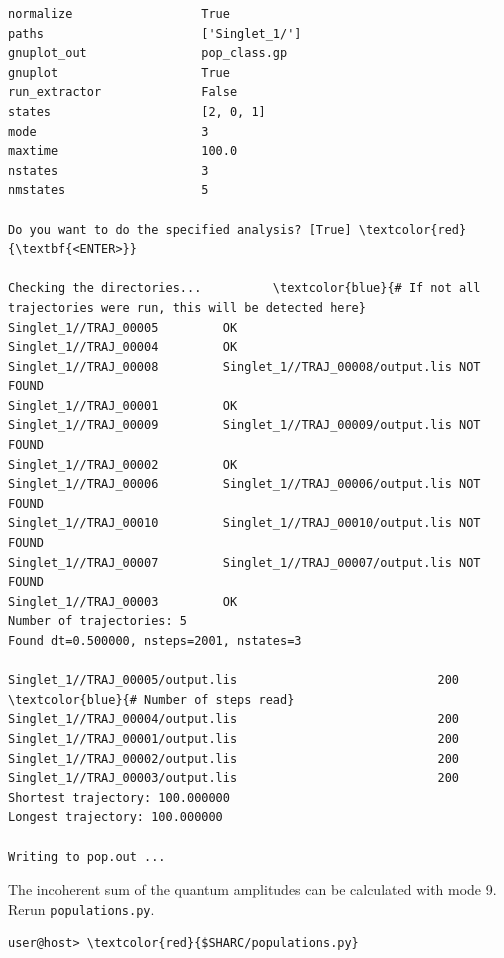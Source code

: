\documentclass[a4paper,11pt,DIV=15,openany]{scrbook}
\newcommand{\ttt}[1]{\texttt{#1}}
\begin{document}
\begin{oframed}
\begin{Verbatim}[commandchars=\\\{\}]
normalize                  True
paths                      ['Singlet_1/']
gnuplot_out                pop_class.gp
gnuplot                    True
run_extractor              False
states                     [2, 0, 1]
mode                       3
maxtime                    100.0
nstates                    3
nmstates                   5

Do you want to do the specified analysis? [True] \textcolor{red}{\textbf{<ENTER>}}

Checking the directories...          \textcolor{blue}{# If not all trajectories were run, this will be detected here}
Singlet_1//TRAJ_00005         OK
Singlet_1//TRAJ_00004         OK
Singlet_1//TRAJ_00008         Singlet_1//TRAJ_00008/output.lis NOT FOUND
Singlet_1//TRAJ_00001         OK
Singlet_1//TRAJ_00009         Singlet_1//TRAJ_00009/output.lis NOT FOUND
Singlet_1//TRAJ_00002         OK
Singlet_1//TRAJ_00006         Singlet_1//TRAJ_00006/output.lis NOT FOUND
Singlet_1//TRAJ_00010         Singlet_1//TRAJ_00010/output.lis NOT FOUND
Singlet_1//TRAJ_00007         Singlet_1//TRAJ_00007/output.lis NOT FOUND
Singlet_1//TRAJ_00003         OK
Number of trajectories: 5
Found dt=0.500000, nsteps=2001, nstates=3

Singlet_1//TRAJ_00005/output.lis                            200          \textcolor{blue}{# Number of steps read}
Singlet_1//TRAJ_00004/output.lis                            200
Singlet_1//TRAJ_00001/output.lis                            200
Singlet_1//TRAJ_00002/output.lis                            200
Singlet_1//TRAJ_00003/output.lis                            200
Shortest trajectory: 100.000000
Longest trajectory: 100.000000

Writing to pop.out ...
\end{Verbatim}
\end{oframed}

\normalsize
The incoherent sum of the quantum amplitudes can be calculated with mode 9. Rerun \ttt{populations.py}.
\begin{Verbatim}[commandchars=\\\{\}]
user@host> \textcolor{red}{$SHARC/populations.py}
\end{Verbatim}
\end{document}
